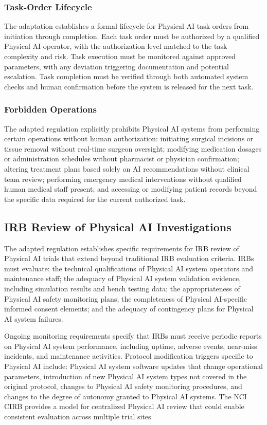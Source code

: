 \subsubsection{Task-Order Lifecycle}

The adaptation establishes a formal lifecycle for Physical AI task orders from
initiation through completion. Each task order must be authorized by a
qualified Physical AI operator, with the authorization level matched to the
task complexity and risk. Task execution must be monitored against approved
parameters, with any deviation triggering documentation and potential
escalation. Task completion must be verified through both automated system
checks and human confirmation before the system is released for the next task.

\subsubsection{Forbidden Operations}

The adapted regulation explicitly prohibits Physical AI systems from performing
certain operations without human authorization: initiating surgical incisions
or tissue removal without real-time surgeon oversight; modifying medication
dosages or administration schedules without pharmacist or physician
confirmation; altering treatment plans based solely on AI recommendations
without clinical team review; performing emergency medical interventions
without qualified human medical staff present; and accessing or modifying
patient records beyond the specific data required for the current authorized
task.

\subsection{IRB Review of Physical AI Investigations}
\label{subsec:cfr50-irb}

The adapted regulation establishes specific requirements for IRB review of
Physical AI trials that extend beyond traditional IRB evaluation criteria.
IRBs must evaluate: the technical qualifications of Physical AI system
operators and maintenance staff; the adequacy of Physical AI system validation
evidence, including simulation results and bench testing data; the
appropriateness of Physical AI safety monitoring plans; the completeness of
Physical AI-specific informed consent elements; and the adequacy of contingency
plans for Physical AI system failures.

Ongoing monitoring requirements specify that IRBs must receive periodic reports
on Physical AI system performance, including uptime, adverse events, near-miss
incidents, and maintenance activities. Protocol modification triggers specific
to Physical AI include: Physical AI system software updates that change
operational parameters, introduction of new Physical AI system types not covered
in the original protocol, changes to Physical AI safety monitoring procedures,
and changes to the degree of autonomy granted to Physical AI systems. The NCI
CIRB \cite{nci-cirb} provides a model for centralized Physical AI review that
could enable consistent evaluation across multiple trial sites.

